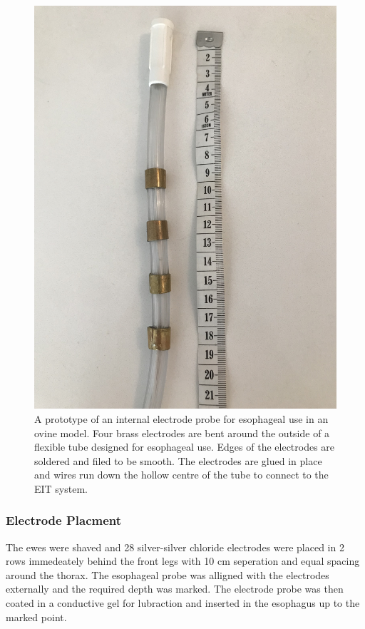 \begin{figure}[H]
    \centering
	\includegraphics[width=\textwidth, angle =-90]{chapter7-internal_elec_motion/imgs/probe_prototype.jpg} 
	\caption[Probe prototype]{\label{fig:probe_design} 
	A prototype of an internal electrode probe for esophageal use in an ovine model.
	Four brass electrodes are bent around the outside of a flexible tube designed for
	esophageal use. Edges of the electrodes are soldered and filed to be smooth. 
	The electrodes are glued in place and wires run down the hollow centre
	of the tube to connect to the EIT system.}
 \end{figure}

\subsubsection{Electrode Placment}
The ewes were shaved and 28 silver-silver chloride electrodes were placed in 2 rows immedeately behind the front
legs with 10 cm seperation and equal spacing around the thorax. 
The esophageal probe was alligned with the electrodes externally and the required
depth was marked. The electrode probe was then coated in a conductive gel for lubraction and inserted in the 
esophagus up to the marked point.

